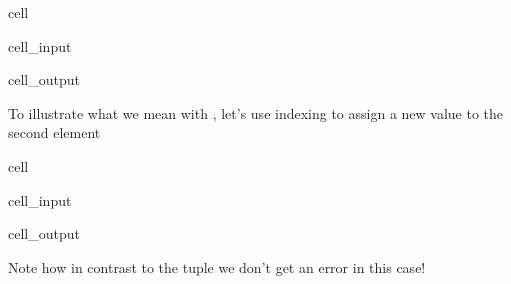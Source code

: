 \documentclass[letterpaper,10pt,english]{jupyterBook}
\begin{document}
\begin{sphinxuseclass}{cell}\begin{sphinxVerbatimInput}

\begin{sphinxuseclass}{cell_input}
\begin{sphinxVerbatim}[commandchars=\\\{\}]
  \PYG{p}{[}  \PYG{p}{]} 
\end{sphinxVerbatim}

\end{sphinxuseclass}\end{sphinxVerbatimInput}
\begin{sphinxVerbatimOutput}

\begin{sphinxuseclass}{cell_output}
\begin{sphinxVerbatim}[commandchars=\\\{\}]
[3, 5, 4]
\end{sphinxVerbatim}

\end{sphinxuseclass}\end{sphinxVerbatimOutput}

\end{sphinxuseclass}
\sphinxAtStartPar
To illustrate what we mean with , let’s use indexing to assign a new value to the second element

\begin{sphinxuseclass}{cell}\begin{sphinxVerbatimInput}

\begin{sphinxuseclass}{cell_input}
\begin{sphinxVerbatim}[commandchars=\\\{\}]
\PYG{p}{[}\PYG{p}{]}  
\end{sphinxVerbatim}

\end{sphinxuseclass}\end{sphinxVerbatimInput}
\begin{sphinxVerbatimOutput}

\begin{sphinxuseclass}{cell_output}
\begin{sphinxVerbatim}[commandchars=\\\{\}]
[3, 6, 4]
\end{sphinxVerbatim}

\end{sphinxuseclass}\end{sphinxVerbatimOutput}

\end{sphinxuseclass}
\sphinxAtStartPar
Note how \sphinxhyphen{} in contrast to the tuple \sphinxhyphen{} we don’t get an error in this case!
\end{document}
